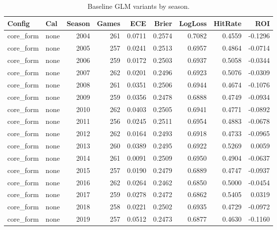 \begin{table}[t]
  \centering
  \footnotesize
  \caption[GLM variants (harness)]{Baseline GLM variants by season.}
  \label{tab:glm-harness}
  \setlength{\tabcolsep}{3pt}\renewcommand{\arraystretch}{1.1}
  \begin{tabular}{@{} l l r r r r r r r @{} }
    \toprule
 \textbf{Config} & \textbf{Cal} & \textbf{Season} & \textbf{Games} & \textbf{ECE} & \textbf{Brier} & \textbf{LogLoss} & \textbf{HitRate} & \textbf{ROI} \\ 
    \midrule
      core\_form & none & 2004 & 261 & 0.0711 & 0.2574 & 0.7082 & 0.4559 & -0.1296 \\
      core\_form & none & 2005 & 257 & 0.0241 & 0.2513 & 0.6957 & 0.4864 & -0.0714 \\
      core\_form & none & 2006 & 259 & 0.0172 & 0.2503 & 0.6937 & 0.5058 & -0.0344 \\
      core\_form & none & 2007 & 262 & 0.0201 & 0.2496 & 0.6923 & 0.5076 & -0.0309 \\
      core\_form & none & 2008 & 261 & 0.0351 & 0.2506 & 0.6944 & 0.4674 & -0.1076 \\
      core\_form & none & 2009 & 259 & 0.0356 & 0.2478 & 0.6888 & 0.4749 & -0.0934 \\
      core\_form & none & 2010 & 262 & 0.0403 & 0.2505 & 0.6941 & 0.4771 & -0.0892 \\
      core\_form & none & 2011 & 256 & 0.0245 & 0.2511 & 0.6954 & 0.4883 & -0.0678 \\
      core\_form & none & 2012 & 262 & 0.0164 & 0.2493 & 0.6918 & 0.4733 & -0.0965 \\
      core\_form & none & 2013 & 260 & 0.0389 & 0.2495 & 0.6922 & 0.5269 & 0.0059 \\
      core\_form & none & 2014 & 261 & 0.0091 & 0.2509 & 0.6950 & 0.4904 & -0.0637 \\
      core\_form & none & 2015 & 257 & 0.0190 & 0.2479 & 0.6889 & 0.4747 & -0.0937 \\
      core\_form & none & 2016 & 262 & 0.0264 & 0.2462 & 0.6850 & 0.5000 & -0.0454 \\
      core\_form & none & 2017 & 259 & 0.0278 & 0.2472 & 0.6862 & 0.5405 & 0.0319 \\
      core\_form & none & 2018 & 258 & 0.0221 & 0.2502 & 0.6935 & 0.4729 & -0.0972 \\
      core\_form & none & 2019 & 257 & 0.0512 & 0.2473 & 0.6877 & 0.4630 & -0.1160 \\

\end{tabular}
\end{table}
